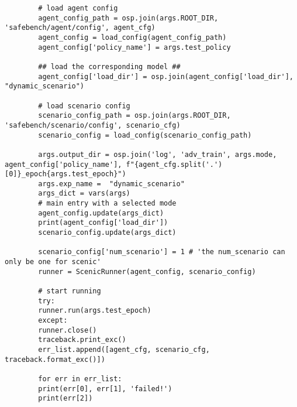 \begin{enumerate}
\begin{verbatim}
		# load agent config
		agent_config_path = osp.join(args.ROOT_DIR, 'safebench/agent/config', agent_cfg)
		agent_config = load_config(agent_config_path)
		agent_config['policy_name'] = args.test_policy
		
		## load the corresponding model ##
		agent_config['load_dir'] = osp.join(agent_config['load_dir'], "dynamic_scenario")
		
		# load scenario config
		scenario_config_path = osp.join(args.ROOT_DIR, 'safebench/scenario/config', scenario_cfg)
		scenario_config = load_config(scenario_config_path)
		
		args.output_dir = osp.join('log', 'adv_train', args.mode, agent_config['policy_name'], f"{agent_cfg.split('.')[0]}_epoch{args.test_epoch}")
		args.exp_name =  "dynamic_scenario"
		args_dict = vars(args)
		# main entry with a selected mode
		agent_config.update(args_dict)
		print(agent_config['load_dir'])
		scenario_config.update(args_dict)
		
		scenario_config['num_scenario'] = 1 # 'the num_scenario can only be one for scenic'
		runner = ScenicRunner(agent_config, scenario_config)
		
		# start running
		try:
		runner.run(args.test_epoch)
		except:
		runner.close()
		traceback.print_exc()
		err_list.append([agent_cfg, scenario_cfg, traceback.format_exc()])
		
		for err in err_list:
		print(err[0], err[1], 'failed!')
		print(err[2])
		
		
	\end{verbatim}
\end{enumerate}
